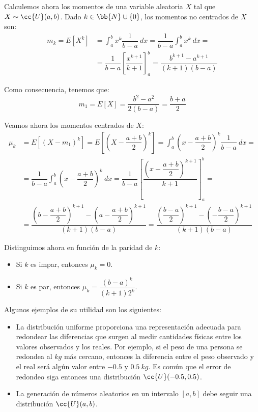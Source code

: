 Calculemos ahora los momentos de una variable aleatoria $X$ tal que $X\sim \cc{U}(a,b)$.
Dado $k\in \bb{N}\cup \{0\}$, los momentos no centrados de $X$ son:
\begin{align*}
    m_k = E[X^k] &= \int_{a}^{b} x^k \dfrac{1}{b-a}~dx = \dfrac{1}{b-a} \int_{a}^{b} x^k~dx =\\
    &= \dfrac{1}{b-a} \left[ \dfrac{x^{k+1}}{k+1} \right]_{a}^{b} = \dfrac{b^{k+1} - a^{k+1}}{(k+1)(b-a)}
\end{align*}

Como consecuencia, tenemos que:
\begin{equation*}
    m_1 = E[X] = \dfrac{b^2 - a^2}{2(b-a)} = \dfrac{b+a}{2}
\end{equation*}

Veamos ahora los momentos centrados de $X$:
\begin{align*}
    \mu_k &= E[(X-m_1)^k] = E\left[\left(X-\dfrac{a+b}{2}\right)^k\right] = \int_{a}^{b} \left(x-\dfrac{a+b}{2}\right)^k \dfrac{1}{b-a}~dx =\\
    &= \dfrac{1}{b-a} \int_{a}^{b} \left(x-\dfrac{a+b}{2}\right)^k~dx
    = \dfrac{1}{b-a} \left[ \dfrac{\left(x-\dfrac{a+b}{2}\right)^{k+1}}{k+1} \right]_{a}^{b}
    =\\&= \dfrac{\left(b-\dfrac{a+b}{2}\right)^{k+1} - \left(a-\dfrac{a+b}{2}\right)^{k+1}}{(k+1)(b-a)}
    = \dfrac{\left(\dfrac{b-a}{2}\right)^{k+1} - \left(-\dfrac{b-a}{2}\right)^{k+1}}{(k+1)(b-a)}
\end{align*}

Distinguimos ahora en función de la paridad de $k$:
\begin{itemize}
    \item Si $k$ es impar, entonces $\mu_k = 0$.
    \item Si $k$ es par, entonces $\mu_k = \dfrac{(b-a)^k}{(k+1)2^k}$.
\end{itemize}







Algunos ejemplos de su utilidad son los siguientes:
\begin{itemize}
    \item La distribución uniforme proporciona una representación adecuada para
    redondear las diferencias que surgen al medir cantidades físicas entre los
    valores observados y los reales.
    Por ejemplo, si el peso de una persona se redondea al $kg$ más cercano,
    entonces la diferencia entre el peso observado y el real será algún valor entre
    $-0.5$ y $0.5~kg$. Es común que el error de redondeo siga entonces una distribución
    $\cc{U}(-0.5,0.5)$.
    
    \item La generación de números aleatorios en un intervalo $[a,b]$ debe seguir una distribución
    $\cc{U}(a,b)$.
\end{itemize}